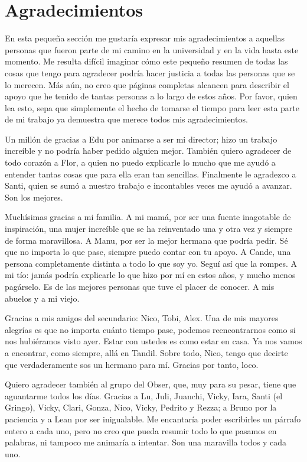 
\chapter{Agradecimientos}

	En esta pequeña sección me gustaría expresar mis agradecimientos a aquellas personas que fueron parte de mi camino en la universidad y en la vida hasta este momento.
	Me resulta difícil imaginar cómo este pequeño resumen de todas las cosas que tengo para agradecer podría hacer justicia a todas las personas que se lo merecen. Más aún, no creo que páginas completas alcancen para describir el apoyo que he tenido de tantas personas a lo largo de estos años.
	Por favor, quien lea esto, sepa que simplemente el hecho de tomarse el tiempo para leer esta parte de mi trabajo ya demuestra que merece todos mis agradecimientos.

	Un millón de gracias a Edu por animarse a ser mi director; hizo un trabajo increíble y no podría haber pedido alguien mejor. También quiero agradecer de todo corazón a Flor, a quien no puedo explicarle lo mucho que me ayudó a entender tantas cosas que para ella eran tan sencillas. Finalmente le agradezco a Santi, quien se sumó a nuestro trabajo e incontables veces me ayudó a avanzar. Son los mejores.

	Muchísimas gracias a mi familia. A mi mamá, por ser una fuente inagotable de inspiración, una mujer increíble que se ha reinventado una y otra vez y siempre de forma maravillosa. A Manu, por ser la mejor hermana que podría pedir. Sé que no importa lo que pase, siempre puedo contar con tu apoyo. A Cande, una persona completamente distinta a todo lo que soy yo. Seguí así que la rompes. A mi tío: jamás podría explicarle lo que hizo por mí en estos años, y mucho menos pagárselo. Es de las mejores personas que tuve el placer de conocer. A mis abuelos y a mi viejo.

	Gracias a mis amigos del secundario: Nico, Tobi, Alex. Una de mis mayores alegrías es que no importa cuánto tiempo pase, podemos reencontrarnos como si nos hubiéramos visto ayer. Estar con ustedes es como estar en casa. Ya nos vamos a encontrar, como siempre, allá en Tandil. Sobre todo, Nico, tengo que decirte que verdaderamente sos un hermano para mí. Gracias por tanto, loco.

	Quiero agradecer también al grupo del Obser, que, muy para su pesar, tiene que aguantarme todos los días. Gracias a Lu, Juli, Juanchi, Vicky, Iara, Santi (el Gringo), Vicky, Clari, Gonza, Nico, Vicky, Pedrito y Rezza; a Bruno por la paciencia y a Lean por ser inigualable. Me encantaría poder escribirles un párrafo entero a cada uno, pero no creo que pueda resumir todo lo que pasamos en palabras, ni tampoco me animaría a intentar. Son una maravilla todos y cada uno.

